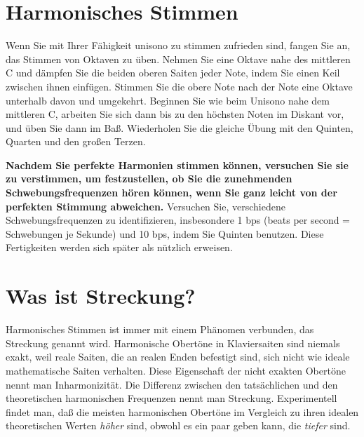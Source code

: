 \hypertarget{c2_5j}{}
\section{Harmonisches Stimmen}\hypertarget{c2_5_harm}{}

Wenn Sie mit Ihrer Fähigkeit unisono zu stimmen zufrieden sind, fangen Sie an, das Stimmen von Oktaven zu üben.
Nehmen Sie eine Oktave nahe des mittleren C und dämpfen Sie die beiden oberen Saiten jeder Note, indem Sie einen Keil zwischen ihnen einfügen.
Stimmen Sie die obere Note nach der Note eine Oktave unterhalb davon und umgekehrt.
Beginnen Sie wie beim Unisono nahe dem mittleren C, arbeiten Sie sich dann bis zu den höchsten Noten im Diskant vor, und üben Sie dann im Baß.
Wiederholen Sie die gleiche Übung mit den Quinten, Quarten und den großen Terzen.

\textbf{Nachdem Sie perfekte Harmonien stimmen können, versuchen Sie sie zu verstimmen, um festzustellen, ob Sie die zunehmenden Schwebungsfrequenzen hören können, wenn Sie ganz leicht von der perfekten Stimmung abweichen.}
Versuchen Sie, verschiedene Schwebungsfrequenzen zu identifizieren, insbesondere 1 bps (beats per second = Schwebungen je Sekunde) und 10 bps, indem Sie Quinten benutzen.
Diese Fertigkeiten werden sich später als nützlich erweisen.
 

\hypertarget{c2_5k}{}
\section{Was ist Streckung?}\hypertarget{c2_5_stre}{}

Harmonisches Stimmen ist immer mit einem Phänomen verbunden, das Streckung genannt wird.
Harmonische Obertöne in Klaviersaiten sind niemals exakt, weil reale Saiten, die an realen Enden befestigt sind, sich nicht wie ideale mathematische Saiten verhalten.
Diese Eigenschaft der nicht exakten Obertöne nennt man Inharmonizität.
Die Differenz zwischen den tatsächlichen und den theoretischen harmonischen Frequenzen nennt man Streckung.
Experimentell findet man, daß die meisten harmonischen Obertöne im Vergleich zu ihren idealen theoretischen Werten \textit{höher} sind, obwohl es ein paar geben kann, die \textit{tiefer} sind.

